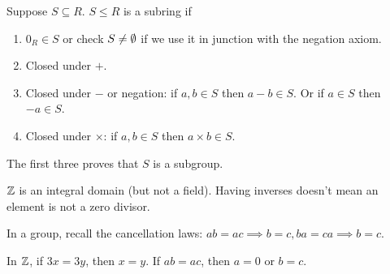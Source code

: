 \documentclass[class=article,crop=false]{standalone}
\begin{document}
\begin{thm}[]
Suppose $ S \subseteq  R$. $ S \leq R$ is a subring if
 \begin{enumerate}[label=(\roman*)]
	\item $ 0_R \in S$ or check $ S \neq \emptyset$ if we use it in junction with the negation axiom.
	\item Closed under $ +$.
	\item Closed under  $ -$ or negation: if  $ a,b \in S$ then $ a-b \in S$. Or if $ a \in S$ then $ -a \in S$.
	\item Closed under $ \times $: if $ a,b \in S$ then $ a \times b \in S$.
\end{enumerate}
\end{thm}
\begin{note}[]
	The first three proves that $ S$ is a subgroup.
\end{note}

\begin{eg}
	$ \mathbb{Z}$ is an integral domain (but not a field). Having inverses doesn't mean an element is not a zero divisor.

In a group, recall the cancellation laws: $ ab=ac \implies b=c, ba=ca\implies b=c$.

In $ \mathbb{Z}$, if $ 3x=3y$, then  $ x=y$. If  $ ab=ac$, then  $ a=0$ or  $ b=c$.
\end{eg}
\end{document}
